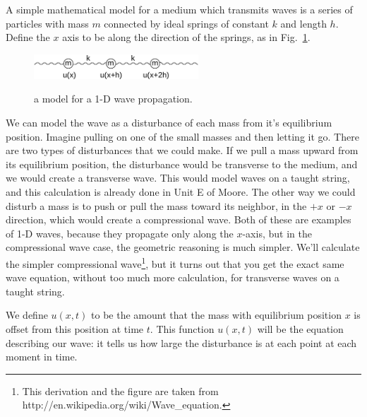 \documentclass[12pt]{article}
\begin{document}
A simple mathematical model for a medium which transmits waves
is a series of particles with mass $m$ connected by ideal springs of
constant $k$ and length $h$.  Define the $x$ axis to be along the direction of the springs, as in Fig.~\ref{fig:masses}.

\begin{figure}[thb]
\begin{center}
{\includegraphics[width=0.55\textwidth]{figs/array_masses.png}}
\end{center}
\caption{\label{fig:masses} a model for a 1-D wave propagation.}
\end{figure}


We can model the wave as a disturbance of each mass from it's equilibrium position.  Imagine pulling on one of the small masses and then letting it go. There are two types of disturbances that we could make. If we pull a mass upward from its equilibrium position, the disturbance would be transverse to the medium, and we would create a transverse wave.  This would model waves on a taught string, and this calculation is already done in Unit E of Moore.  The other way we could disturb a mass is to push or pull the mass toward its neighbor, in the $+x$ or $-x$ direction, which would create a compressional wave.  Both of these are examples of 1-D waves, because  they propagate only along the $x$-axis, but in the compressional wave case, the geometric reasoning is much simpler.  We'll calculate the simpler compressional wave\footnote{This derivation and the figure are taken from http://en.wikipedia.org/wiki/Wave\_equation.}, but it turns out that you get the exact same wave equation, without too much more calculation, for transverse waves on a taught string.

We define $u(x,t)$ to be the amount that the mass with equilibrium position $x$ is offset from this position at time $t$.  This function $u(x,t)$ will be the equation describing our wave: it tells us how large the disturbance is at each point at each moment in time.
\end{document}

